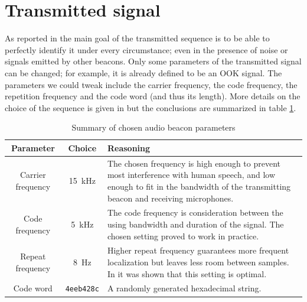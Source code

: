 \documentclass[11pt,titlepage]{report}
\begin{document}
\section{Transmitted signal}
\label{sec:loc_transmit}
As reported in \cite{epo4-del7} the main goal of the transmitted sequence is to be able to perfectly identify it under every circumstance; even in the presence of noise or signals emitted by other beacons. Only some parameters of the transmitted signal can be changed; for example, it is already defined to be an OOK signal. The parameters we could tweak include the carrier frequency, the code frequency, the repetition frequency and the code word (and thus its length). More details on the choice of the sequence is given in \cite{epo4-del7} but the conclusions are summarized in table \ref{tab:loc_signal}.

\begin{table}[H]
\centering
\begin{tabular}{ c | c | p{10cm}}
\hline \hline
Parameter & Choice & Reasoning \\
\hline
Carrier frequency & \SI{15}{kHz} & 
The chosen frequency is high enough to prevent most interference with human speech, and low enough to fit in the bandwidth of the transmitting beacon and receiving microphones.\\
Code frequency & \SI{5}{kHz} & The code frequency is consideration between the using bandwidth and duration of the signal. The chosen setting proved to work in practice. \\
Repeat frequency & \SI{8}{Hz} & Higher repeat frequency guarantees more frequent localization but leaves less room between samples. In \cite{epo4-del7} it was shown that this setting is optimal.\\
Code word & \texttt{4eeb428c} & A randomly generated hexadecimal string.\\
\end{tabular}
\caption{Summary of chosen audio beacon parameters}
\label{tab:loc_signal}
\end{table}
\end{document}
